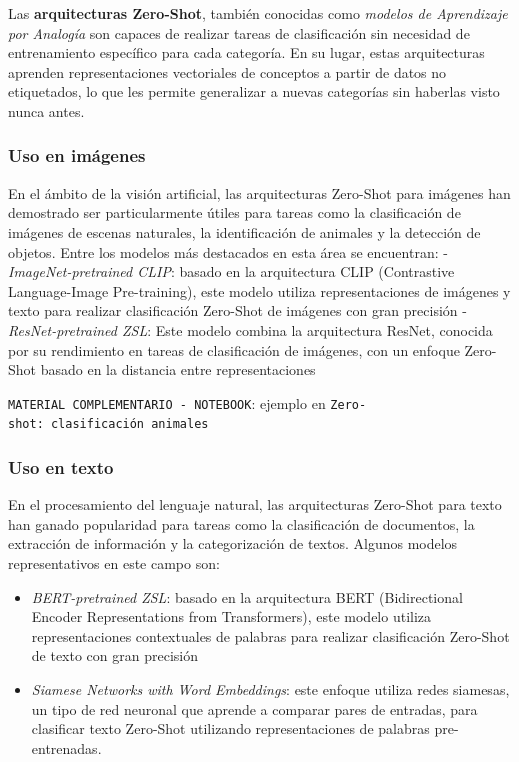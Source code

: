 \documentclass[
  a4paper,
  DIV=11,
  numbers=noendperiod]{scrreprt}
\providecommand{\tightlist}{%
  \setlength{\itemsep}{0pt}\setlength{\parskip}{0pt}}\usepackage{longtable,booktabs,array}
\begin{document}
Las \textbf{arquitecturas Zero-Shot}, también conocidas como
\emph{modelos de Aprendizaje por Analogía} son capaces de realizar
tareas de clasificación sin necesidad de entrenamiento específico para
cada categoría. En su lugar, estas arquitecturas aprenden
representaciones vectoriales de conceptos a partir de datos no
etiquetados, lo que les permite generalizar a nuevas categorías sin
haberlas visto nunca antes.

\subsubsection{Uso en imágenes}\label{uso-en-imuxe1genes}

En el ámbito de la visión artificial, las arquitecturas Zero-Shot para
imágenes han demostrado ser particularmente útiles para tareas como la
clasificación de imágenes de escenas naturales, la identificación de
animales y la detección de objetos. Entre los modelos más destacados en
esta área se encuentran: - \emph{ImageNet-pretrained CLIP}: basado en la
arquitectura CLIP (Contrastive Language-Image Pre-training), este modelo
utiliza representaciones de imágenes y texto para realizar clasificación
Zero-Shot de imágenes con gran precisión - \emph{ResNet-pretrained ZSL}:
Este modelo combina la arquitectura ResNet, conocida por su rendimiento
en tareas de clasificación de imágenes, con un enfoque Zero-Shot basado
en la distancia entre representaciones

\texttt{MATERIAL\ COMPLEMENTARIO\ -\ NOTEBOOK}: ejemplo en
\texttt{Zero-shot:\ clasificación\ animales}

\subsubsection{Uso en texto}\label{uso-en-texto}

En el procesamiento del lenguaje natural, las arquitecturas Zero-Shot
para texto han ganado popularidad para tareas como la clasificación de
documentos, la extracción de información y la categorización de textos.
Algunos modelos representativos en este campo son:

\begin{itemize}
\tightlist
\item
  \emph{BERT-pretrained ZSL}: basado en la arquitectura BERT
  (Bidirectional Encoder Representations from Transformers), este modelo
  utiliza representaciones contextuales de palabras para realizar
  clasificación Zero-Shot de texto con gran precisión
\item
  \emph{Siamese Networks with Word Embeddings}: este enfoque utiliza
  redes siamesas, un tipo de red neuronal que aprende a comparar pares
  de entradas, para clasificar texto Zero-Shot utilizando
  representaciones de palabras pre-entrenadas.
\end{itemize}
\end{document}
